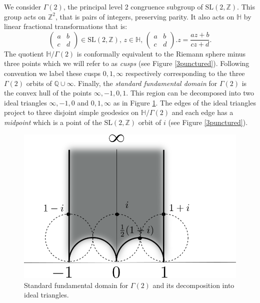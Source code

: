 \documentclass[12pt,a4paper]{amsart}
\def\HH{\mathbb{H}}
\def\xx{\HH/g2}
\def\ZZ{\mathbb{Z}}
\def\QQ{\mathbb{Q}}
\def\sl2{\mathrm{SL}(2, \ZZ)}
\def\g2{\Gamma(2)}
\def\xx{\HH/\g2}
\begin{document}
We consider $\g2$,
the principal level 2 congruence subgroup of $\sl2$.
This group acts on $\ZZ^2$, that is pairs of integers,  preserving parity.
It also acts on $\HH$ by linear fractional transformations
that is:
$$\begin{pmatrix}
a & b \\
c & d
\end{pmatrix} \in \sl2,\, z\in \HH,\, 
\begin{pmatrix}
a & b \\
c & d
\end{pmatrix}. z = \frac{az + b}{cz + d}.
$$
The quotient $\xx$ is conformally equivalent to the Riemann  sphere minus three points
which we will refer to as \textit{cusps}
(see Figure \ref{3punctured}). 
Following  convention we label these cusps $0,1,\infty$ respectively
corresponding to the three $\g2$ orbits of $\QQ \cup \infty$. 
Finally, the \textit{standard fundamental domain}  for $\g2$ 
is the convex hull of the points $\infty, -1, 0 , 1$.
This region can be decomposed into two ideal triangles 
$\infty, -1, 0 $ and $ 0 , 1,\infty$ as in Figure \ref{fund}.
The edges of the ideal triangles project to three disjoint simple geodesics on $\xx$
and each edge has a \textit{midpoint} 
which is a point of the $\sl2$ orbit of $i$ (see Figure \ref{3punctured}).

 \begin{figure}[hb]
\begin{center}
\includegraphics[scale=.5]{fund_dom.png} 
\end{center}
\caption{Standard fundamental domain for $\g2$ and its decomposition into ideal triangles.}
\label{fund}
\end{figure}
\end{document}
